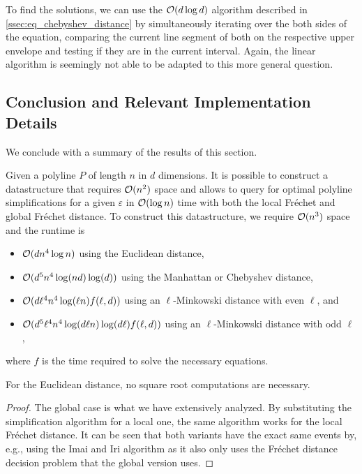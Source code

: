 To find the solutions, we can use the \(\mathcal{O}(d \log d)\) algorithm described in \cref{ssec:eq_chebyshev_distance} by simultaneously iterating over the both sides of the equation, comparing the current line segment of both on the respective upper envelope and testing if they are in the current interval. Again, the linear algorithm is seemingly not able to be adapted to this more general question.

\subsection{Conclusion and Relevant Implementation Details}
We conclude with a summary of the results of this section. 
\begin{theorem}\label{thm:query-ds}
	Given a polyline \(P\) of length \(n\) in \(d\) dimensions. It is possible to construct a datastructure that requires \(\mathcal{O}(n^2)\) space and allows to query for optimal polyline simplifications for a given \(\varepsilon\) in \(\mathcal{O}(\log n)\) time with both the local Fréchet and global Fréchet distance. To construct this datastructure, we require \(\mathcal{O}(n^3)\) space and the runtime is 
	\begin{itemize}
		\item \(\mathcal{O}(d n^4 \log n)\) using the Euclidean distance, 
		\item \(\mathcal{O}(d^5 n^4 \log(nd)\log(d))\) using the Manhattan or Chebyshev distance, 
		\item \(\mathcal{O}(d\ell^4 n^4 \log(\ell n)f(\ell, d))\) using an \(\ell\)-Minkowski distance with even \(\ell\), and 
		\item \(\mathcal{O}(d^5\ell^4 n^4 \log(d \ell n)\log(d \ell)f(\ell, d))\) using an \(\ell\)-Minkowski distance with odd \(\ell\),
	\end{itemize}

	where \(f\) is the time required to solve the necessary equations.

	For the Euclidean distance, no square root computations are necessary.
\end{theorem}

\begin{proof}
  The global case is what we have extensively analyzed. By substituting the simplification algorithm for a local one, the same algorithm works for the local Fréchet distance. It can be seen that both variants have the exact same events by, e.g., using the Imai and Iri algorithm as it also only uses the Fréchet distance decision problem that the global version uses. 
\end{proof}

